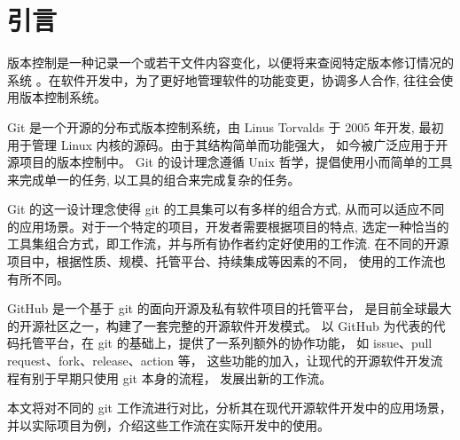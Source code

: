 \documentclass[../main.tex]{subfiles}
\begin{document}
\section{引言}

版本控制是一种记录一个或若干文件内容变化，以便将来查阅特定版本修订情况的系统
\cite{progit}。在软件开发中，为了更好地管理软件的功能变更，协调多人合作,
往往会使用版本控制系统。

Git 是一个开源的分布式版本控制系统，由 Linus Torvalds 于 2005 年开发,
最初用于管理 Linux 内核的源码。由于其结构简单而功能强大，
如今被广泛应用于开源项目的版本控制中。
Git 的设计理念遵循 Unix 哲学，提倡使用小而简单的工具来完成单一的任务,
以工具的组合来完成复杂的任务。

Git 的这一设计理念使得 git 的工具集可以有多样的组合方式,
从而可以适应不同的应用场景。对于一个特定的项目，开发者需要根据项目的特点,
选定一种恰当的工具集组合方式，即工作流，并与所有协作者约定好使用的工作流.
在不同的开源项目中，根据性质、规模、托管平台、持续集成等因素的不同，
使用的工作流也有所不同。

GitHub 是一个基于 git 的面向开源及私有软件项目的托管平台，
是目前全球最大的开源社区之一，构建了一套完整的开源软件开发模式。
以 GitHub 为代表的代码托管平台，在 git 的基础上，提供了一系列额外的协作功能，
如 issue、pull request、fork、release、action 等，
这些功能的加入，让现代的开源软件开发流程有别于早期只使用 git 本身的流程，
发展出新的工作流。

本文将对不同的 git 工作流进行对比，分析其在现代开源软件开发中的应用场景，
并以实际项目为例，介绍这些工作流在实际开发中的使用。
\end{document}
